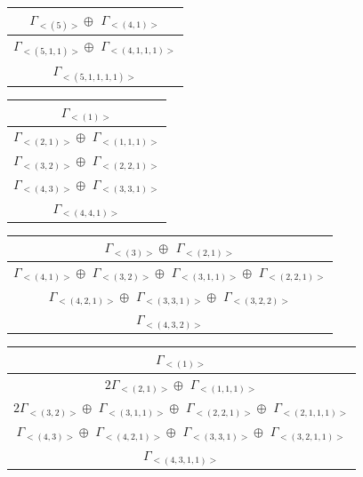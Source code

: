 \begin{minipage}{.4\textwidth}
\centering
\begin{tabular}{|c|}\hline
$\Gamma_{<(
5
)>} \oplus$
$\Gamma_{<(
4 , 
1
)>}$
\\ \hline
$\Gamma_{<(
5 , 
1 , 
1
)>} \oplus$
$\Gamma_{<(
4 , 
1 , 
1 , 
1
)>}$
\\ \hline
$\Gamma_{<(
5 , 
1 , 
1 , 
1 , 
1
)>}$
\\
\hline\end{tabular}\end{minipage}
\bigskip
\begin{minipage}{.4\textwidth}
\centering
\begin{tabular}{|c|}\hline
$\Gamma_{<(
1
)>}$
\\ \hline
$\Gamma_{<(
2 , 
1
)>} \oplus$
$\Gamma_{<(
1 , 
1 , 
1
)>}$
\\ \hline
$\Gamma_{<(
3 , 
2
)>} \oplus$
$\Gamma_{<(
2 , 
2 , 
1
)>}$
\\ \hline
$\Gamma_{<(
4 , 
3
)>} \oplus$
$\Gamma_{<(
3 , 
3 , 
1
)>}$
\\ \hline
$\Gamma_{<(
4 , 
4 , 
1
)>}$
\\
\hline\end{tabular}\end{minipage}
\begin{minipage}{.6\textwidth}
\centering
\begin{tabular}{|c|}\hline
$\Gamma_{<(
3
)>} \oplus$
$\Gamma_{<(
2 , 
1
)>}$
\\ \hline
$\Gamma_{<(
4 , 
1
)>} \oplus$
$\Gamma_{<(
3 , 
2
)>} \oplus$
$\Gamma_{<(
3 , 
1 , 
1
)>} \oplus$
$\Gamma_{<(
2 , 
2 , 
1
)>}$
\\ \hline
$\Gamma_{<(
4 , 
2 , 
1
)>} \oplus$
$\Gamma_{<(
3 , 
3 , 
1
)>} \oplus$
$\Gamma_{<(
3 , 
2 , 
2
)>}$
\\ \hline
$\Gamma_{<(
4 , 
3 , 
2
)>}$
\\
\hline\end{tabular}\end{minipage}
\bigskip
\begin{minipage}{.5\textwidth}
\centering
\begin{tabular}{|c|}\hline
$\Gamma_{<(
1
)>}$
\\ \hline
$ 2 \Gamma_{<(
2 , 
1
)>} \oplus$
$\Gamma_{<(
1 , 
1 , 
1
)>}$
\\ \hline
$ 2 \Gamma_{<(
3 , 
2
)>} \oplus$
$\Gamma_{<(
3 , 
1 , 
1
)>} \oplus$
$\Gamma_{<(
2 , 
2 , 
1
)>} \oplus$
$\Gamma_{<(
2 , 
1 , 
1 , 
1
)>}$
\\ \hline
$\Gamma_{<(
4 , 
3
)>} \oplus$
$\Gamma_{<(
4 , 
2 , 
1
)>} \oplus$
$\Gamma_{<(
3 , 
3 , 
1
)>} \oplus$
$\Gamma_{<(
3 , 
2 , 
1 , 
1
)>}$
\\ \hline
$\Gamma_{<(
4 , 
3 , 
1 , 
1
)>}$
\\
\hline\end{tabular}\end{minipage}
